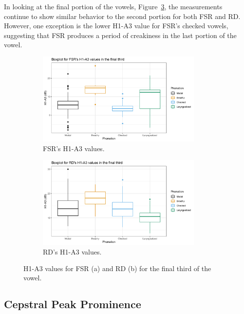 \documentclass[12pt, letterpaper]{article}
\begin{document}
In looking at the final portion of the vowels, Figure~\ref{fig:h1a3third}, the measurements continue to show similar behavior to the second portion for both FSR and RD. However, one exception is the lower H1-A3 value for FSR's checked vowels, suggesting that FSR produces a period of creakiness in the last portion of the vowel.

\begin{figure}[!ht]
	\centering
	\begin{subfigure}{.5\textwidth}
		\centering
		\includegraphics[width=0.9\textwidth]{../mean_FSR_h1a3_third.png}
		\caption{FSR's H1-A3 values.}
		\label{fig:FSRh1a3third} 
	\end{subfigure}%
	\begin{subfigure}{.5\textwidth}
		\centering
		\includegraphics[width=0.9\textwidth]{../mean_RD_h1a3_third.png}
		\caption{RD's H1-A3 values.}
		\label{fig:RDh1a3third} 
	\end{subfigure}
	\caption{H1-A3 values for FSR (a) and RD (b) for the final third of the vowel. }
	\label{fig:h1a3third}
\end{figure}

\subsection{Cepstral Peak Prominence} \label{sec:CPP}
\end{document}
